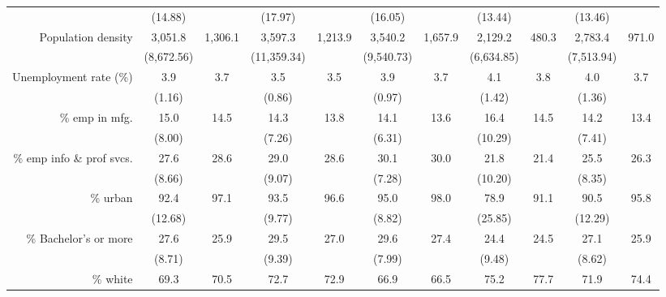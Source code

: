 \begin{tabular}{r*{5}{c}*{5}{c}}
                    &     (14.88)&            &     (17.97)&            &     (16.05)&            &     (13.44)&            &     (13.46)&            \\
Population density  &     3,051.8&     1,306.1&     3,597.3&     1,213.9&     3,540.2&     1,657.9&     2,129.2&       480.3&     2,783.4&       971.0\\
                    &  (8,672.56)&            & (11,359.34)&            &  (9,540.73)&            &  (6,634.85)&            &  (7,513.94)&            \\
Unemployment rate (\%)&         3.9&         3.7&         3.5&         3.5&         3.9&         3.7&         4.1&         3.8&         4.0&         3.7\\
                    &      (1.16)&            &      (0.86)&            &      (0.97)&            &      (1.42)&            &      (1.36)&            \\
\% emp in mfg.      &        15.0&        14.5&        14.3&        13.8&        14.1&        13.6&        16.4&        14.5&        14.2&        13.4\\
                    &      (8.00)&            &      (7.26)&            &      (6.31)&            &     (10.29)&            &      (7.41)&            \\
\% emp info \& prof svcs.&        27.6&        28.6&        29.0&        28.6&        30.1&        30.0&        21.8&        21.4&        25.5&        26.3\\
                    &      (8.66)&            &      (9.07)&            &      (7.28)&            &     (10.20)&            &      (8.35)&            \\
\% urban            &        92.4&        97.1&        93.5&        96.6&        95.0&        98.0&        78.9&        91.1&        90.5&        95.8\\
                    &     (12.68)&            &      (9.77)&            &      (8.82)&            &     (25.85)&            &     (12.29)&            \\
\% Bachelor's or more&        27.6&        25.9&        29.5&        27.0&        29.6&        27.4&        24.4&        24.5&        27.1&        25.9\\
                    &      (8.71)&            &      (9.39)&            &      (7.99)&            &      (9.48)&            &      (8.62)&            \\
\% white            &        69.3&        70.5&        72.7&        72.9&        66.9&        66.5&        75.2&        77.7&        71.9&        74.4\\

\end{tabular}
